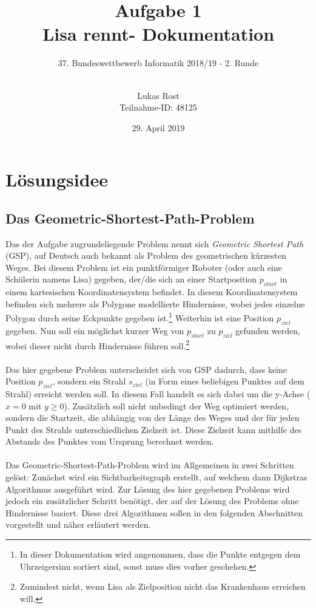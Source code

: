 \documentclass[a4paper, notitlepage, 12pt]{scrartcl}
\author{Lukas Rost \\ \small{Teilnahme-ID: 48125}}
\title{Aufgabe 1 \\ \glqq Lisa rennt\grqq  - Dokumentation}
\subtitle{37. Bundeswettbewerb Informatik 2018/19 - 2. Runde \\~\\}
\date{29. April 2019}
\begin{document}
\renewcommand{\contentsname}{\centerline{Inhaltsverzeichnis}}
 \maketitle
 \tableofcontents
 \setcounter{page}{1}
 
 \section{Lösungsidee}
 \subsection{Das Geometric-Shortest-Path-Problem}
 Das der Aufgabe zugrundeliegende Problem nennt sich \textit{Geometric Shortest Path} (GSP), auf Deutsch auch bekannt als Problem des geometrischen kürzesten Weges. Bei diesem Problem ist ein punktförmiger Roboter (oder auch eine Schülerin namens Lisa) gegeben, der/die sich an einer Startposition $p_{start}$ in einem kartesischen Koordinatensystem befindet. In diesem Koordinatensystem befinden sich mehrere als Polygone modellierte Hindernisse, wobei jedes einzelne Polygon durch seine Eckpunkte gegeben ist.\footnote{In dieser Dokumentation wird angenommen, dass die Punkte entgegen dem Uhrzeigersinn sortiert sind, sonst muss dies vorher geschehen.} Weiterhin ist eine Position $p_{ziel}$ gegeben. Nun soll ein möglichst kurzer Weg von $p_{start}$ zu $p_{ziel}$ gefunden werden, wobei dieser nicht durch Hindernisse führen soll.\footnote{Zumindest nicht, wenn Lisa als Zielposition nicht das Krankenhaus erreichen will.}\cite{Src:noem} \\ \\
 Das hier gegebene Problem unterscheidet sich von GSP dadurch, dass keine Position $p_{ziel}$, sondern ein Strahl $s_{ziel}$ (in Form eines beliebigen Punktes auf dem Strahl) erreicht werden soll. In diesem Fall handelt es sich dabei um die y-Achse ($x=0$ mit $y \geq 0$). Zusätzlich soll nicht unbedingt der Weg optimiert werden, sondern die Startzeit, die abhängig von der Länge des Weges und der für jeden Punkt des Strahls unterschiedlichen Zielzeit ist. Diese Zielzeit kann mithilfe des Abstands des Punktes vom Ursprung berechnet werden. \\ \\
 Das Geometric-Shortest-Path-Problem wird im Allgemeinen in zwei Schritten gelöst: Zunächst wird ein Sichtbarkeitsgraph erstellt, auf welchem dann Dijkstras Algorithmus ausgeführt wird. Zur Lösung des hier gegebenen Problems wird jedoch ein zusätzlicher Schritt benötigt, der auf der Lösung des Problems ohne Hindernisse basiert. Diese drei Algorithmen sollen in den folgenden Abschnitten vorgestellt und näher erläutert werden.
\end{document}
